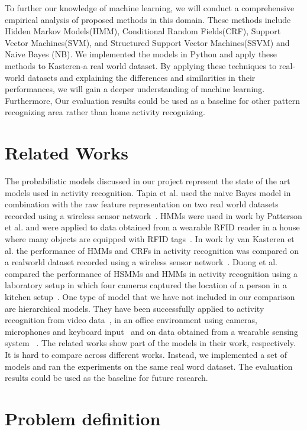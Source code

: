 \documentclass[11pt, oneside]{article}   	%
\begin{document}
To further our knowledge of machine learning, we will conduct a comprehensive empirical analysis of proposed methods in this domain. These methods include Hidden Markov Models(HMM), Conditional Random Fields(CRF), Support Vector Machines(SVM), and Structured Support Vector Machines(SSVM) and Naive Bayes (NB). We implemented the models in Python and apply these methods to Kasteren-a real world dataset. By applying these techniques to real-world datasets and explaining the differences and similarities in their performances, we will gain a deeper understanding of machine learning. Furthermore, 
Our evaluation results could be used as a baseline for other pattern recognizing area rather than home activity recognizing.

\section{Related Works}

The probabilistic models discussed in our project represent the state of the art models used in activity recognition. Tapia et al. used the naive Bayes model in combination with the raw feature representation on two real world datasets recorded using a wireless sensor network~\cite{emtapia}. HMMs were used in work by Patterson et al. and were applied to data obtained from a wearable RFID reader in a house where many objects are equipped with RFID tags~\cite{djpatt}. In work by van Kasteren et al. the performance of HMMs and CRFs in activity recognition was compared on a realworld dataset recorded using a wireless sensor network~\cite{tvkasteren}. Duong et al. compared the performance of HSMMs and HMMs in activity recognition using a laboratory setup in which four cameras captured the location of a person in a kitchen setup~\cite{tduong}. One type of model that we have not included in our comparison are hierarchical models. They have been successfully applied to activity recognition from video data~\cite{sluhr}, in an office environment using cameras, microphones and keyboard input~\cite{noliver} and on data obtained from a wearable sensing system ~\cite{asubr}.
The related works show part of the models in their work, respectively. It is hard to compare across different works. Instead, we implemented a set of models and ran the experiments on the same real word dataset. The evaluation results could be used as the baseline for future research. 


\section{Problem definition}
\end{document}
